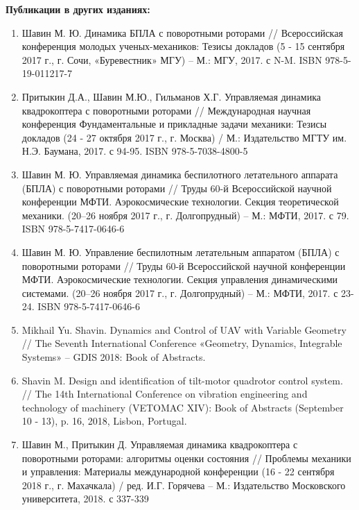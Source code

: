 \textbf{Публикации в других изданиях:}

\begin{enumerate}
	\item Шавин М. Ю. Динамика БПЛА с поворотными роторами // Всероссийская конференция молодых ученых-механиков: Тезисы докладов (5 - 15 сентября 2017 г., г. Сочи, «Буревестник» МГУ)  – М.: МГУ, 2017. с N-M. ISBN 978-5-19-011217-7
	
	\item Притыкин Д.А., Шавин М.Ю., Гильманов Х.Г. Управляемая динамика квадрокоптера с поворотными роторами // Международная научная конференция Фундаментальные и прикладные задачи механики: Тезисы докладов (24 - 27 октября 2017 г., г. Москва) / М.: Издательство МГТУ им. Н.Э. Баумана, 2017. с 94-95.
	ISBN 978-5-7038-4800-5
	
	\item Шавин М. Ю. Управляемая динамика беспилотного летательного аппарата (БПЛА) с поворотными роторами // Труды 60-й Всероссийской научной конференции МФТИ. Аэрокосмические технологии. Секция теоретической механики. (20–26 ноября 2017 г., г. Долгопрудный) -- М.: МФТИ, 2017. с 79. ISBN 978-5-7417-0646-6
	
	\item Шавин М. Ю. Управление беспилотным летательным аппаратом (БПЛА) с поворотными роторами // Труды 60-й Всероссийской научной конференции МФТИ. Аэрокосмические технологии. Секция управления динамическими системами. (20–26 ноября 2017 г., г. Долгопрудный) -- М.: МФТИ, 2017. с 23-24. ISBN 978-5-7417-0646-6
	
	\item Mikhail Yu. Shavin. Dynamics and Control of UAV with Variable Geometry // The Seventh International Conference «Geometry, Dynamics, Integrable Systems» – GDIS 2018: Book of Abstracts.
	
	\item Shavin M. Design and identification of tilt-motor quadrotor control system. // The 14th International Conference on vibration engineering and technology of machinery (VETOMAC XIV): Book of Abstracts (September 10 - 13), p. 16, 2018, Lisbon, Portugal.
	
	\item Шавин М., Притыкин Д. Управляемая динамика квадрокоптера с поворотными роторами: алгоритмы оценки состояния // Проблемы механики и управления: Материалы международной конференции (16 - 22 сентября 2018 г., г. Махачкала) / ред. И.Г. Горячева – М.: Издательство Московского университета, 2018. с 337-339
	
\end{enumerate}
